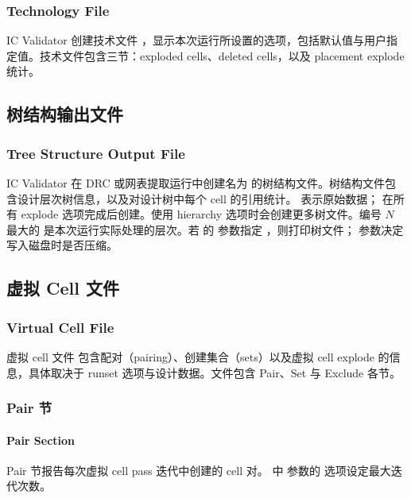 \subsubsection*{Technology File}

IC Validator 创建技术文件 ，显示本次运行所设置的选项，包括默认值与用户指定值。技术文件包含三节：exploded cells、deleted cells，以及 placement explode 统计。

\subsection{树结构输出文件}
\subsubsection*{Tree Structure Output File}

IC Validator 在 DRC 或网表提取运行中创建名为  的树结构文件。树结构文件包含设计层次树信息，以及对设计树中每个 cell 的引用统计。 表示原始数据； 在所有 explode 选项完成后创建。使用 hierarchy 选项时会创建更多树文件。编号 $N$ 最大的  是本次运行实际处理的层次。若  的  参数指定 ，则打印树文件； 参数决定写入磁盘时是否压缩。

\subsection{虚拟 Cell 文件}
\subsubsection*{Virtual Cell File}

虚拟 cell 文件  包含配对（pairing）、创建集合（sets）以及虚拟 cell explode 的信息，具体取决于 runset 选项与设计数据。文件包含 Pair、Set 与 Exclude 各节。

\subsubsection{Pair 节}
\paragraph*{Pair Section}

Pair 节报告每次虚拟 cell pass 迭代中创建的 cell 对。 中  参数的  选项设定最大迭代次数。

